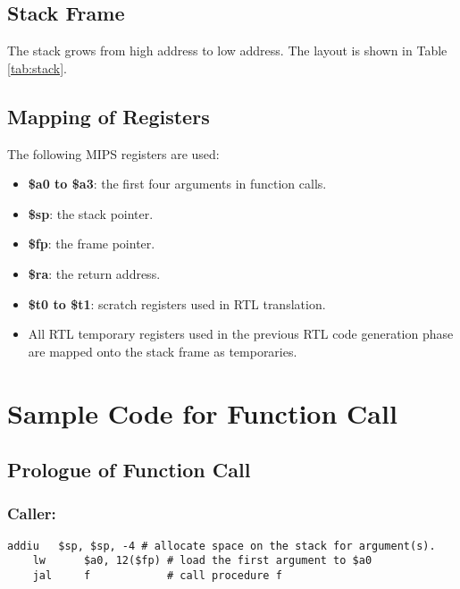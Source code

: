 \documentclass[a4paper,11pt]{article}
\begin{document}
\subsection{Stack Frame}
The stack grows from high address to low address. The layout is shown in Table \ref{tab:stack}.
\subsection{Mapping of Registers}
The following MIPS registers are used:
\begin{itemize}
	\item \textbf{\$a0 to \$a3}: the first four arguments in function calls.
	\item \textbf{\$sp}: the stack pointer.
	\item \textbf{\$fp}: the frame pointer.
	\item \textbf{\$ra}: the return address.
	\item \textbf{\$t0 to \$t1}: scratch registers used in RTL translation.
	\item All RTL temporary registers used in the previous RTL code generation phase are mapped onto the stack frame as temporaries.
\end{itemize}

\newpage
\appendix

\section{Sample Code for Function Call}
\subsection{Prologue of Function Call}
\subsubsection*{Caller:}
\newlength{\ttCharWidth}
\begin{lstlisting}[breakindent=28\ttCharWidth]
    addiu   $sp, $sp, -4 # allocate space on the stack for argument(s).
    lw      $a0, 12($fp) # load the first argument to $a0
    jal     f            # call procedure f

\end{lstlisting}
\end{document}
